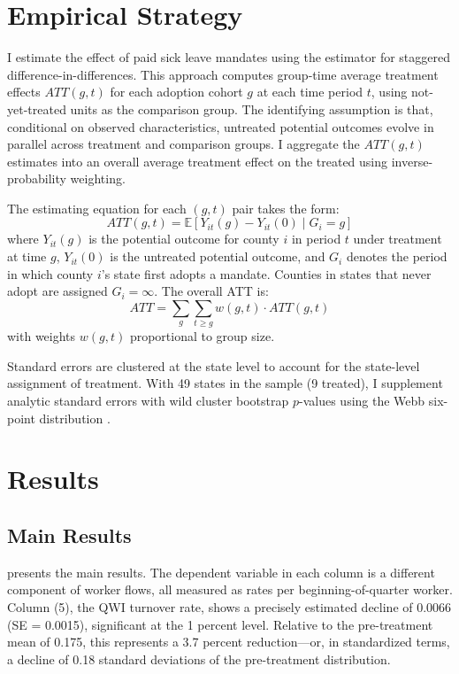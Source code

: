 \documentclass[12pt]{article}
\newcommand{\E}{\mathbb{E}}
\begin{document}
\section{Empirical Strategy}\label{sec:empirical}

I estimate the effect of paid sick leave mandates using the \citet{CallawayS2021} estimator for staggered difference-in-differences. This approach computes group-time average treatment effects $ATT(g,t)$ for each adoption cohort $g$ at each time period $t$, using not-yet-treated units as the comparison group. The identifying assumption is that, conditional on observed characteristics, untreated potential outcomes evolve in parallel across treatment and comparison groups. I aggregate the $ATT(g,t)$ estimates into an overall average treatment effect on the treated using inverse-probability weighting.

The estimating equation for each $(g,t)$ pair takes the form:
\begin{equation}
ATT(g,t) = \E\left[Y_{it}(g) - Y_{it}(0) \mid G_i = g\right]
\end{equation}
where $Y_{it}(g)$ is the potential outcome for county $i$ in period $t$ under treatment at time $g$, $Y_{it}(0)$ is the untreated potential outcome, and $G_i$ denotes the period in which county $i$'s state first adopts a mandate. Counties in states that never adopt are assigned $G_i = \infty$. The overall ATT is:
\begin{equation}
ATT = \sum_g \sum_{t \geq g} w(g,t) \cdot ATT(g,t)
\end{equation}
with weights $w(g,t)$ proportional to group size.

Standard errors are clustered at the state level to account for the state-level assignment of treatment. With 49 states in the sample (9 treated), I supplement analytic standard errors with wild cluster bootstrap $p$-values \citep{CameronGM2008} using the Webb six-point distribution \citep{Webb2014}.


\section{Results}\label{sec:results}

\subsection{Main Results}

 presents the main results. The dependent variable in each column is a different component of worker flows, all measured as rates per beginning-of-quarter worker. Column (5), the QWI turnover rate, shows a precisely estimated decline of 0.0066 (SE = 0.0015), significant at the 1 percent level. Relative to the pre-treatment mean of 0.175, this represents a 3.7 percent reduction---or, in standardized terms, a decline of 0.18 standard deviations of the pre-treatment distribution.
\end{document}
